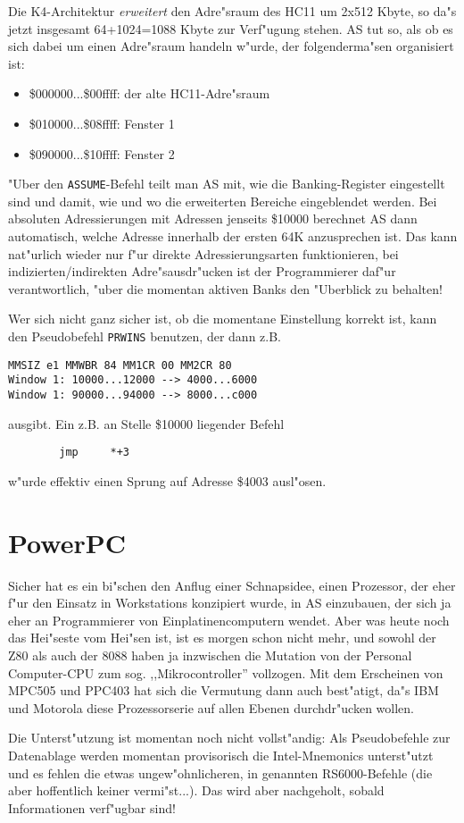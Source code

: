 \documentclass[12pt,a4paper,twoside]{report}
\begin{document}
Die K4-Architektur {\em erweitert} den Adre"sraum des HC11 um 2x512 Kbyte,
so da"s jetzt insgesamt 64+1024=1088 Kbyte zur Verf"ugung stehen.  AS tut
so, als ob es sich dabei um einen Adre"sraum handeln w"urde, der
folgenderma"sen organisiert ist:
\begin{itemize}
\item{\$000000...\$00ffff: der alte HC11-Adre"sraum}
\item{\$010000...\$08ffff: Fenster 1}
\item{\$090000...\$10ffff: Fenster 2}
\end{itemize}
"Uber den {\tt ASSUME}-Befehl teilt man AS mit, wie die Banking-Register
eingestellt sind und damit, wie und wo die erweiterten Bereiche
eingeblendet werden.  Bei absoluten Adressierungen mit Adressen jenseits
\$10000 berechnet AS dann automatisch, welche Adresse innerhalb der ersten
64K anzusprechen ist.  Das kann nat"urlich wieder nur f"ur direkte
Adressierungsarten funktionieren, bei indizierten/indirekten
Adre"sausdr"ucken ist der Programmierer daf"ur verantwortlich, "uber die
momentan aktiven Banks den "Uberblick zu behalten!

Wer sich nicht ganz sicher ist, ob die momentane Einstellung korrekt ist,
kann den Pseudobefehl {\tt PRWINS} benutzen, der dann z.B.
\begin{verbatim}
MMSIZ e1 MMWBR 84 MM1CR 00 MM2CR 80
Window 1: 10000...12000 --> 4000...6000
Window 1: 90000...94000 --> 8000...c000
\end{verbatim}
ausgibt.  Ein z.B. an Stelle \$10000 liegender Befehl
\begin{verbatim}
        jmp     *+3
\end{verbatim}
w"urde effektiv einen Sprung auf Adresse \$4003 ausl"osen.


\section{PowerPC}

Sicher hat es ein bi"schen den Anflug einer Schnapsidee, einen Prozessor,
der eher f"ur den Einsatz in Workstations konzipiert wurde, in AS
einzubauen, der sich ja eher an Programmierer von Einplatinencomputern
wendet.  Aber was heute noch das Hei"seste vom Hei"sen ist, ist es morgen
schon nicht mehr, und sowohl der Z80 als auch der 8088 haben ja inzwischen
die Mutation von der Personal Computer-CPU zum sog. ,,Mikrocontroller''
vollzogen.  Mit dem Erscheinen von MPC505 und PPC403 hat sich die Vermutung
dann auch best"atigt, da"s IBM und Motorola diese Prozessorserie auf allen
Ebenen durchdr"ucken wollen.
\par
Die Unterst"utzung ist momentan noch nicht vollst"andig: Als Pseudobefehle
zur Datenablage werden momentan provisorisch die Intel-Mnemonics
unterst"utzt und es fehlen die etwas ungew"ohnlicheren, in \cite{Mot601}
genannten RS6000-Befehle (die aber hoffentlich keiner vermi"st...).  Das
wird aber nachgeholt, sobald Informationen verf"ugbar sind!
\end{document}
